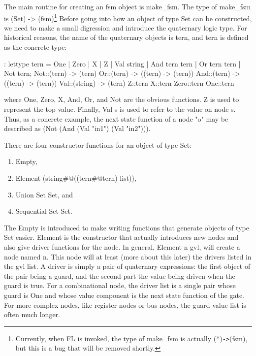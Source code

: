 The main routine for creating an fsm object is make\_fsm.
The type of make\_fsm is (Set) -> (fsm)\footnote{Currently, when
FL is invoked, the type of make\_fsm is actually (*)\verb!->!(fsm), but
this is a bug that will be removed shortly.}
Before going into how an object of type Set can be constructed, we
need to make a small digression and introduce the quaternary logic type.
For historical reasons, the name of the quaternary objects is tern,
and tern is defined as the concrete type:
\begin{hol}
: lettype tern =  One |
                Zero |
                X |
                Z |
                Val string |
                And tern tern |
                Or tern tern |
                Not tern;
Not::(tern) -> (tern)
Or::(tern) -> ((tern) -> (tern))
And::(tern) -> ((tern) -> (tern))
Val::(string) -> (tern)
Z::tern
X::tern
Zero::tern
One::tern
\end{hol}
where One, Zero, X, And, Or, and Not are the obvious functions.
Z is used to represent the top value.
Finally, Val s is used to refer to the value on node s.
Thus, as a concrete example, the next state function of a node "o" may
be described as (Not (And (Val "in1") (Val "in2"))).

There are four constructor functions for an object of type Set:
\begin{enumerate}
\item
Empty,
\item
Element (string\verb@#@((tern\verb@#@tern) list)),
\item
Union Set Set, and
\item
Sequential Set Set.
\end{enumerate}
The Empty is introduced to make writing functions that generate
objects of type Set easier.
Element is the constructor that actually introduces new nodes and
also give driver functions for the node.
In general, Element n gvl, will create a node named n.
This node will at least (more about this later) the drivers
listed in the gvl list.
A driver is simply a pair of quaternary expressions:
the first object of the pair being a guard, and the second part
the value being driven when the guard is true.
For a combinational node, the driver list is a single pair whose
guard is One and whose value component is the next state function
of the gate.
For more complex nodes, like register nodes or bus nodes, the guard-value
list is often much longer.


